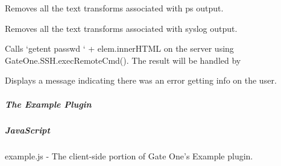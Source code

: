 \documentclass[letterpaper,10pt,openany]{sphinxmanual}
\begin{document}
\begin{fulllineitems}
\begin{fulllineitems}
\label{Applications/terminal/plugin_convenience:GateOne.Convenience.unregisterPSConvenience}
Removes all the text transforms associated with ps output.

\end{fulllineitems}



\begin{fulllineitems}
\label{Applications/terminal/plugin_convenience:GateOne.Convenience.unregisterSyslogConvenience}
Removes all the text transforms associated with syslog output.

\end{fulllineitems}



\begin{fulllineitems}
\label{Applications/terminal/plugin_convenience:GateOne.Convenience.userInfo}
Calls `getent passwd ` + elem.innerHTML on the server using GateOne.SSH.execRemoteCmd().  The result will be handled by 

\end{fulllineitems}



\begin{fulllineitems}
\label{Applications/terminal/plugin_convenience:GateOne.Convenience.userInfoError}
Displays a message indicating there was an error getting info on the user.

\end{fulllineitems}


\end{fulllineitems}



\subparagraph{The Example Plugin}
\label{Applications/terminal/plugin_example:example-plugin}\label{Applications/terminal/plugin_example:the-example-plugin}\label{Applications/terminal/plugin_example::doc}

\subparagraph{JavaScript}
\label{Applications/terminal/plugin_example:javascript}
example.js - The client-side portion of Gate One's Example plugin.
\end{document}
